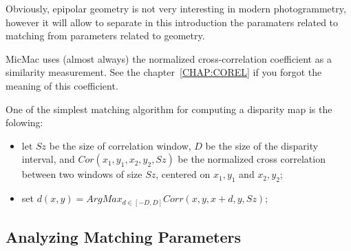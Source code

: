 Obviously, epipolar geometry is not very interesting in modern
photogrammetry, however it will allow to separate in this introduction the 
paramaters related to  matching  from parameters related to geometry.



MicMac uses (almost always) the normalized cross-correlation coefficient
as a similarity measurement. See the chapter~\ref{CHAP:COREL} if you
forgot the meaning of this coefficient.

One of the simplest matching algorithm for computing a disparity map is
the folowing:

\begin{itemize}
    \item let $Sz$ be the size of correlation window, $D$ be the size of the
          disparity interval, and $Cor(x_1,y_1,x_2,y_2,Sz)$ be the normalized
          cross correlation between two windows of size $Sz$, centered on $x_1,y_1$
           and $x_2,y_2$;

    \item set $d(x,y) = ArgMax_{d\in[-D,D]} Corr(x,y,x+d,y,Sz)$;
\end{itemize}


\subsection{Analyzing Matching Parameters}

